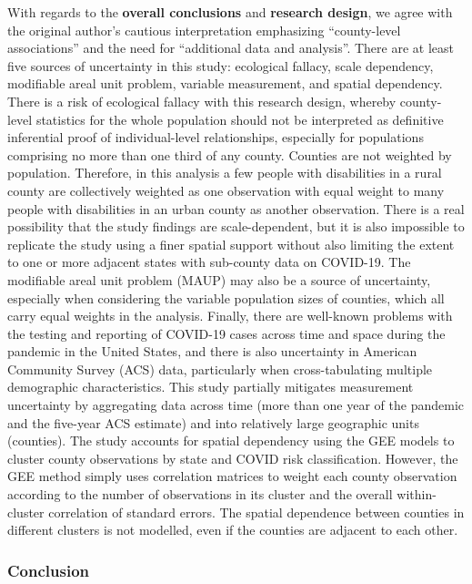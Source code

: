 \documentclass[
]{article}
\begin{document}
With regards to the \textbf{overall conclusions} and \textbf{research
design}, we agree with the original author's cautious interpretation
emphasizing ``county-level associations'' and the need for ``additional
data and analysis''. There are at least five sources of uncertainty in
this study: ecological fallacy, scale dependency, modifiable areal unit
problem, variable measurement, and spatial dependency. There is a risk
of ecological fallacy with this research design, whereby county-level
statistics for the whole population should not be interpreted as
definitive inferential proof of individual-level relationships,
especially for populations comprising no more than one third of any
county. Counties are not weighted by population. Therefore, in this
analysis a few people with disabilities in a rural county are
collectively weighted as one observation with equal weight to many
people with disabilities in an urban county as another observation.
There is a real possibility that the study findings are scale-dependent,
but it is also impossible to replicate the study using a finer spatial
support without also limiting the extent to one or more adjacent states
with sub-county data on COVID-19. The modifiable areal unit problem
(MAUP) may also be a source of uncertainty, especially when considering
the variable population sizes of counties, which all carry equal weights
in the analysis. Finally, there are well-known problems with the testing
and reporting of COVID-19 cases across time and space during the
pandemic in the United States, and there is also uncertainty in American
Community Survey (ACS) data, particularly when cross-tabulating multiple
demographic characteristics. This study partially mitigates measurement
uncertainty by aggregating data across time (more than one year of the
pandemic and the five-year ACS estimate) and into relatively large
geographic units (counties). The study accounts for spatial dependency
using the GEE models to cluster county observations by state and COVID
risk classification. However, the GEE method simply uses correlation
matrices to weight each county observation according to the number of
observations in its cluster and the overall within-cluster correlation
of standard errors. The spatial dependence between counties in different
clusters is not modelled, even if the counties are adjacent to each
other.

\hypertarget{conclusion}{%
\subsubsection{Conclusion}\label{conclusion}}
\end{document}
